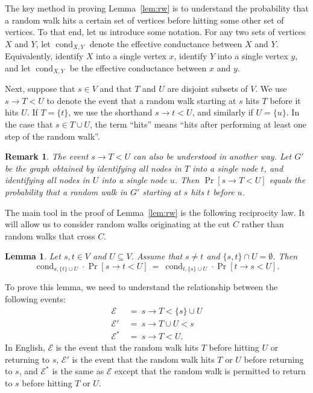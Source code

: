 \documentclass[11pt]{article}
\numberwithin{equation}{section}
\newtheorem{lemma}[theorem]{Lemma}
\newtheorem*{remark}{Remark}
\newcommand{\cE}{\mathcal{E}}
\newcommand{\cond}{\operatorname{cond}}
\newcommand{\EquationName}[1]{\label{eq:#1}}
\newcommand{\LemmaName}[1]{\label{lem:#1}}
\newcommand{\Lemma}[1]{Lemma~\ref{lem:#1}}
\begin{document}
The key method in proving \Lemma{rw} is to understand the probability
that a random walk hits a certain set of vertices before hitting some other set of vertices.
To that end, let us introduce some notation.
For any two sets of vertices $X$ and $Y$, 
let $\cond_{X,Y}$ denote the effective conductance between $X$ and $Y$.
Equivalently, identify $X$ into a single vertex $x$, identify $Y$ into a single vertex $y$,
and let $\cond_{X,Y}$ be the effective conductance between $x$ and $y$.

Next, suppose that $s \in V$ and that $T$ and $U$ are disjoint subsets of $V$.
We use $s \rightarrow T < U$ to denote the event that 
a random walk starting at $s$ hits $T$ before it hits $U$.
If $T = \{t\}$, we use the shorthand $s \rightarrow t < U$,
and similarly if $U = \{u\}$.
In the case that $s \in T \cup U$, the term ``hits'' means
``hits after performing at least one step of the random walk''.

\begin{remark}
The event $s \rightarrow T < U$ can also be understood in another way.
Let $G'$ be the graph obtained by identifying all nodes in $T$ into a single node $t$,
and identifying all nodes in $U$ into a single node $u$.
Then $\Pr[s \rightarrow T < U]$ equals the probability that a random walk in $G'$
starting at $s$ hits $t$ before $u$.
\end{remark}

The main tool in the proof of \Lemma{rw} is the following reciprocity law.
It will allow us to consider random walks originating at the cut $C$ rather
than random walks that cross $C$.

\begin{lemma}
\LemmaName{switch}
Let $s, t \in V$ and $U \subseteq V$.
Assume that $s \neq t$ and $\{s,t\} \cap U = \emptyset$.
Then
\begin{equation}
\EquationName{recip}
        \cond_{s,\{t\} \cup U} \cdot \Pr[s\rightarrow t < U]
    ~=~ \cond_{t,\{s\} \cup U} \cdot \Pr[t \rightarrow s < U].
\end{equation}
\end{lemma}

To prove this lemma, we need to understand the relationship between the following events:
\begin{align*}
\cE   &~=~ s\rightarrow T < \{s\} \cup U \\
\cE'  &~=~ s\rightarrow T \cup U < s \\
\cE^* &~=~  s\rightarrow T < U.
\end{align*}
In English, $\cE$ is the event
that the random walk hits $T$ before hitting $U$ or returning to $s$,
$\cE'$ is the event that the random walk hits $T$ or $U$ before returning to $s$,
and $\cE^*$ is the same as $\cE$ except that
the random walk is permitted to return to $s$ before hitting $T$ or $U$.
\end{document}
